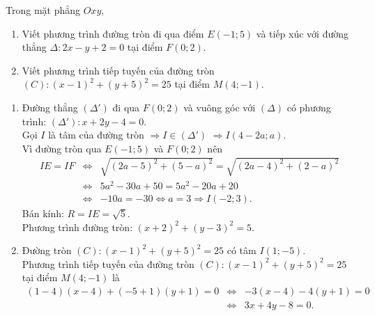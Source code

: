 \begin{bt}%
	Trong mặt phẳng $Oxy$,
	\begin{enumerate}
		\item Viết phương trình đường tròn đi qua điểm $E(-1;5)$ và tiếp xúc với đường thẳng $\Delta\colon 2x-y+2=0$ tại điểm $F(0;2)$.
		\item Viết phương trình tiếp tuyến của đường tròn $(C)\colon (x-1)^2+(y+5)^2=25$ tại điểm $M(4;-1)$.
	\end{enumerate}
	\loigiai
	{
		\begin{enumerate}
			\item Đường thẳng $\left(\Delta'\right)$ đi qua $F\left(0;2\right)$ và vuông góc với $\left(\Delta\right)$ có phương trình: $\left(\Delta'\right):x+2y-4=0$.\\
			Gọi $I$ là tâm của đường tròn $\Rightarrow I\in \left(\Delta'\right)$
			$\Rightarrow I\left(4-2a;a\right)$.\\
			Vì đường tròn qua $E\left(-1;5\right)$ và $F\left(0;2\right)$ nên
			\begin{eqnarray*}
				IE=IF&\Leftrightarrow& \sqrt{\left(2a-5\right)^2+\left(5-a\right)^2}=\sqrt{\left(2a-4\right)^2+\left(2-a\right)^2}\\
				&\Leftrightarrow& 5a^2-30a+50=5a^2-20a+20\\
				&\Leftrightarrow& -10a=-30\Leftrightarrow a=3\Rightarrow I\left(-2;3\right).
			\end{eqnarray*}
			Bán kính: $R=IE=\sqrt{5}$.\\
			Phương trình đường tròn: $\left(x+2\right)^2+\left(y-3\right)^2=5$.
			\item Đường tròn $\left(C\right):\left(x-1\right)^2+\left(y+5\right)^2=25$ có tâm $I\left(1;-5\right)$.\\
			Phương trình tiếp tuyến của đường tròn $\left(C\right)\colon\left(x-1\right)^2+\left(y+5\right)^2=25$ tại điểm $M\left(4;-1\right)$ là
			\begin{eqnarray*}
				\left(1-4\right)\left(x-4\right)+\left(-5+1\right)\left(y+1\right)=0&\Leftrightarrow& -3\left(x-4\right)-4\left(y+1\right)=0\\
				&\Leftrightarrow& 3x+4y-8=0.
			\end{eqnarray*}
		\end{enumerate}
	}
\end{bt}

